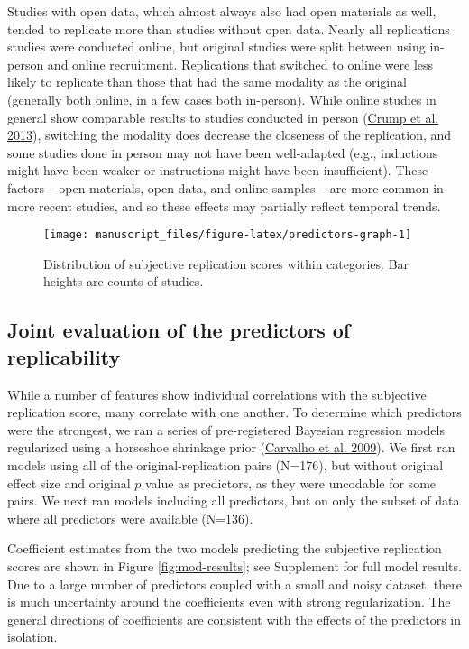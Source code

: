 \documentclass[
  english,
  a4paper,
]{article}
\begin{document}
Studies with open data, which almost always also had open materials as well, tended to replicate more than studies without open data. Nearly all replications studies were conducted online, but original studies were split between using in-person and online recruitment. Replications that switched to online were less likely to replicate than those that had the same modality as the original (generally both online, in a few cases both in-person). While online studies in general show comparable results to studies conducted in person (\protect\hyperlink{ref-crump2013}{Crump et al. 2013}), switching the modality does decrease the closeness of the replication, and some studies done in person may not have been well-adapted (e.g., inductions might have been weaker or instructions might have been insufficient). These factors -- open materials, open data, and online samples -- are more common in more recent studies, and so these effects may partially reflect temporal trends.

\begin{figure}[ht]
\texttt{[image: manuscript\_files/figure-latex/predictors-graph-1]} \caption{Distribution of subjective replication scores within categories. Bar heights are counts of studies.}\label{fig:predictors-graph}
\end{figure}

\hypertarget{joint-evaluation-of-the-predictors-of-replicability}{%
\subsection{Joint evaluation of the predictors of replicability}\label{joint-evaluation-of-the-predictors-of-replicability}}

While a number of features show individual correlations with the subjective replication score, many correlate with one another. To determine which predictors were the strongest, we ran a series of pre-registered Bayesian regression models regularized using a horseshoe shrinkage prior (\protect\hyperlink{ref-carvalho09}{Carvalho et al. 2009}). We first ran models using all of the original-replication pairs (N=176), but without original effect size and original \(p\) value as predictors, as they were uncodable for some pairs. We next ran models including all predictors, but on only the subset of data where all predictors were available (N=136).

Coefficient estimates from the two models predicting the subjective replication scores are shown in Figure \ref{fig:mod-results}; see Supplement for full model results. Due to a large number of predictors coupled with a small and noisy dataset, there is much uncertainty around the coefficients even with strong regularization. The general directions of coefficients are consistent with the effects of the predictors in isolation.
\end{document}
